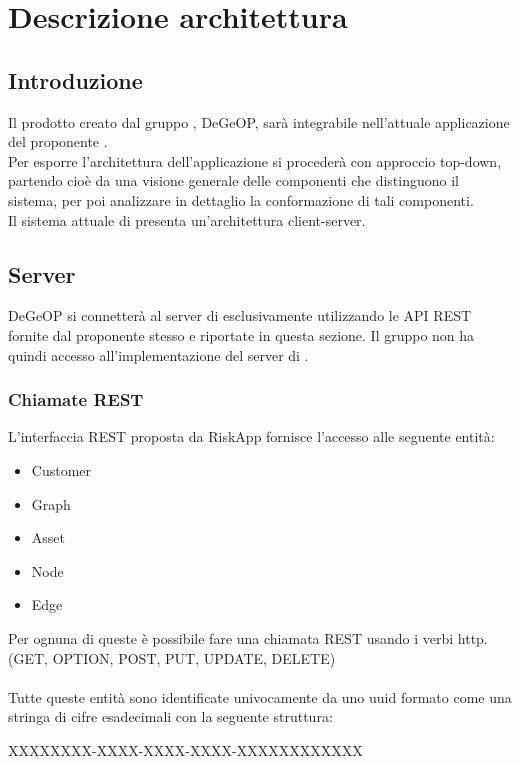\newpage

\section{Descrizione architettura}
\label{descrizione_architettura}
\subsection{Introduzione}
Il prodotto creato dal gruppo \zephyrus{}, DeGeOP, sarà integrabile nell'attuale applicazione del proponente \riskapp{}.
\\Per esporre l'architettura dell'applicazione si procederà con approccio top-down, partendo cioè da una visione generale delle componenti che distinguono il sistema, per poi analizzare in dettaglio la conformazione di tali componenti.
\\Il sistema attuale di \riskapp{} presenta un'architettura client-server.
\subsection{Server}
DeGeOP si connetterà al server di \riskapp{} esclusivamente utilizzando le API REST fornite dal proponente stesso e riportate in questa sezione. Il gruppo non ha quindi accesso all'implementazione del server di \riskapp{}.
\subsubsection{Chiamate REST}
L'interfaccia REST proposta da RiskApp fornisce l'accesso alle seguente entità:
\begin{itemize}
	\item Customer
	\item Graph
	\item Asset
	\item Node
	\item Edge
\end{itemize}
Per ognuna di queste è possibile fare una chiamata REST usando i verbi http. (GET, OPTION, POST, PUT, UPDATE, DELETE)\\\\
Tutte queste entità sono identificate univocamente da uno uuid formato come una stringa di cifre esadecimali con la seguente struttura:
\begin{center}
	XXXXXXXX-XXXX-XXXX-XXXX-XXXXXXXXXXXX
\end{center}

